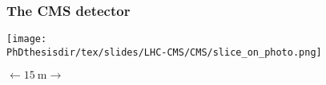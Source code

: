 \begin{frame}\addtocounter{framenumber}{-1}
\frametitle{The CMS detector}
\begin{center}
\vphantom{detects muons going through}

\vfill

\texttt{[image: \\PhDthesisdir/tex/slides/LHC-CMS/CMS/slice\_on\_photo.png]}

\vfill

$\longleftarrow \SI{15}{\meter} \longrightarrow$
\end{center}
\end{frame}